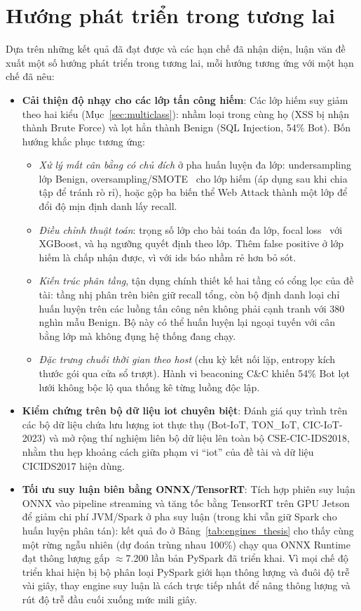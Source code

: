 \section{Hướng phát triển trong tương lai}
Dựa trên những kết quả đã đạt được và các hạn chế đã nhận diện, luận văn đề xuất một số hướng phát triển trong tương lai, mỗi hướng tương ứng với một hạn chế đã nêu:
\begin{itemize}
    \item \textbf{Cải thiện độ nhạy cho các lớp tấn công hiếm}: Các lớp hiếm suy giảm theo hai kiểu (Mục~\ref{sec:multiclass}): nhầm loại trong cùng họ (XSS bị nhận thành Brute Force) và lọt hẳn thành Benign (SQL Injection, 54\% Bot). Bốn hướng khắc phục tương ứng:
    \begin{itemize}
        \item \emph{Xử lý mất cân bằng có chủ đích} ở pha huấn luyện đa lớp: undersampling lớp Benign, oversampling/SMOTE~\cite{chawla2002smote} cho lớp hiếm (áp dụng sau khi chia tập để tránh rò rỉ), hoặc gộp ba biến thể Web Attack thành một lớp để đổi độ mịn định danh lấy recall.
        \item \emph{Điều chỉnh thuật toán}: trọng số lớp cho bài toán đa lớp, focal loss~\cite{lin2017focal} với XGBoost, và hạ ngưỡng quyết định theo lớp. Thêm false positive ở lớp hiếm là chấp nhận được, vì với \ac{ids} báo nhầm rẻ hơn bỏ sót.
        \item \emph{Kiến trúc phân tầng}, tận dụng chính thiết kế hai tầng có cổng lọc của đề tài: tầng nhị phân trên biên giữ recall tổng, còn bộ định danh loại chỉ huấn luyện trên các luồng tấn công nên không phải cạnh tranh với 380 nghìn mẫu Benign. Bộ này có thể huấn luyện lại ngoại tuyến với cân bằng lớp mà không đụng hệ thống đang chạy.
        \item \emph{Đặc trưng chuỗi thời gian theo host} (chu kỳ kết nối lặp, entropy kích thước gói qua cửa sổ trượt). Hành vi beaconing C\&C khiến 54\% Bot lọt lưới không bộc lộ qua thống kê từng luồng độc lập.
    \end{itemize}
    \item \textbf{Kiểm chứng trên bộ dữ liệu \ac{iot} chuyên biệt}: Đánh giá quy trình trên các bộ dữ liệu chứa lưu lượng \ac{iot} thực thụ (Bot-IoT, TON\_IoT, CIC-IoT-2023) và mở rộng thí nghiệm liên bộ dữ liệu lên toàn bộ CSE-CIC-IDS2018, nhằm thu hẹp khoảng cách giữa phạm vi ``\ac{iot}'' của đề tài và dữ liệu CICIDS2017 hiện dùng.
    \item \textbf{Tối ưu suy luận biên bằng ONNX/TensorRT}: Tích hợp phiên suy luận ONNX vào pipeline streaming và tăng tốc bằng TensorRT trên GPU Jetson để giảm chi phí JVM/Spark ở pha suy luận (trong khi vẫn giữ Spark cho huấn luyện phân tán): kết quả đo ở Bảng~\ref{tab:engines_thesis} cho thấy cùng một rừng ngẫu nhiên (dự đoán trùng nhau 100\%) chạy qua ONNX Runtime đạt thông lượng gấp $\approx$7.200 lần bản PySpark đã triển khai. Vì mọi chế độ triển khai hiện bị bộ phân loại PySpark giới hạn thông lượng và đuôi độ trễ vài giây, thay engine suy luận là cách trực tiếp nhất để nâng thông lượng và rút độ trễ đầu cuối xuống mức mili giây.

\end{itemize}
